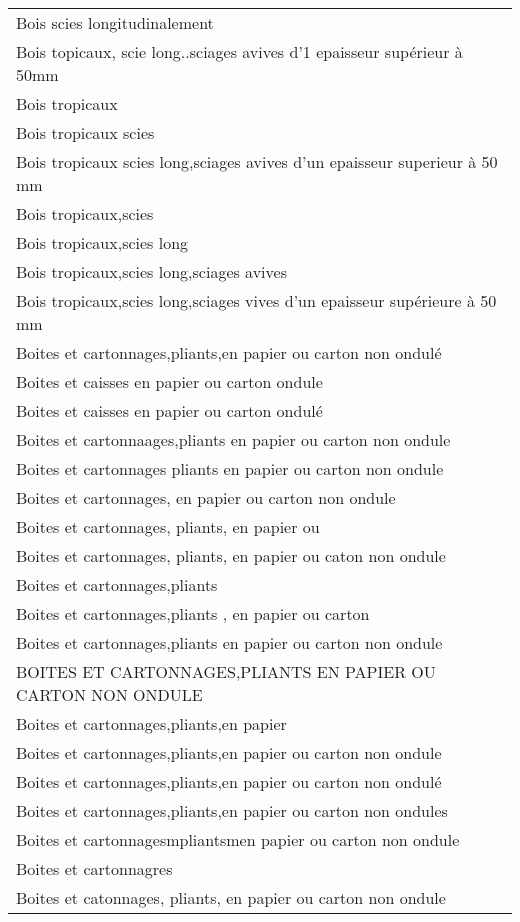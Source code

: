 \documentclass[
]{book}
\begin{document}
\begin{longtable}[t]{l}
Bois scies longitudinalement\\
Bois topicaux, scie long..sciages avives d'1 epaisseur supérieur à 50mm\\
Bois tropicaux\\
\addlinespace
Bois tropicaux scies\\
Bois tropicaux scies long,sciages avives d'un epaisseur superieur à 50 mm\\
Bois tropicaux,scies\\
Bois tropicaux,scies long\\
Bois tropicaux,scies long,sciages avives\\
\addlinespace
Bois tropicaux,scies long,sciages vives d'un epaisseur supérieure à 50 mm\\
Boites  et cartonnages,pliants,en papier ou carton non ondulé\\
Boites et caisses en papier ou carton ondule\\
Boites et caisses en papier ou carton ondulé\\
Boites et cartonnaages,pliants en papier ou carton non ondule\\
\addlinespace
Boites et cartonnages pliants en papier ou carton non ondule\\
Boites et cartonnages, en papier ou carton non ondule\\
Boites et cartonnages, pliants, en papier ou\\
Boites et cartonnages, pliants, en papier ou caton non ondule\\
Boites et cartonnages,pliants\\
\addlinespace
Boites et cartonnages,pliants , en papier ou carton\\
Boites et cartonnages,pliants en papier ou carton non ondule\\
BOITES ET CARTONNAGES,PLIANTS EN PAPIER OU CARTON NON ONDULE\\
Boites et cartonnages,pliants,en papier\\
Boites et cartonnages,pliants,en papier ou carton non ondule\\
\addlinespace
Boites et cartonnages,pliants,en papier ou carton non ondulé\\
Boites et cartonnages,pliants,en papier ou carton non ondules\\
Boites et cartonnagesmpliantsmen papier ou carton non ondule\\
Boites et cartonnagres\\
Boites et catonnages, pliants, en papier ou carton non ondule\\

\end{longtable}
\end{document}
